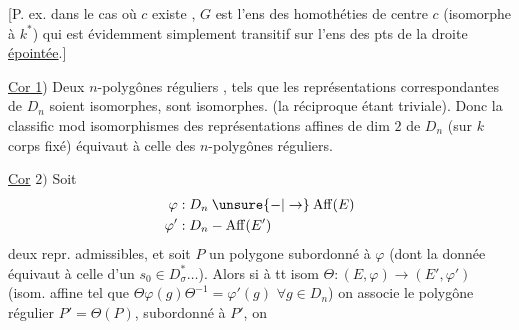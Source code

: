 [P. ex. dans le cas où $c$ existe , $G$ est l'ens des homothéties de centre $c$ (isomorphe à $k^*$) qui est évidemment simplement transitif sur l'ens des pts de la droite  \uline{épointée}.]

\uline{Cor 1}) Deux $n$-polygônes réguliers  , tels que les représentations correspondantes de $D_n$ soient isomorphes, sont isomorphes. (la réciproque étant triviale). Donc la classific mod isomorphismes des représentations affines  de dim $2$ de $D_n$ (sur $k$ corps fixé) équivaut à celle des $n$-polygônes réguliers.

\uline{Cor} $2)$ Soit
\[
\begin{aligned}
\varphi &:D_n\mathbin{\unsure{-|\to}}\mathrm{Aff}(E)\\
\varphi' &:D_n\mathbin{-}\mathrm{Aff}(E')
\end{aligned}
\]
deux repr. admissibles, et soit $P$ un polygone  subordonné à $\varphi$ (dont la donnée équivaut à celle d'un $s_0\in D_\sigma^*\ldots$). Alors si à tt isom $\Theta:(E,\varphi)\to(E',\varphi')$ (isom. affine  tel que $\Theta\varphi(g)\Theta^{-1}=\varphi'(g)$ $\forall g\in D_n$) on associe le polygône régulier  $P'=\Theta(P)$, subordonné à $P'$, on
